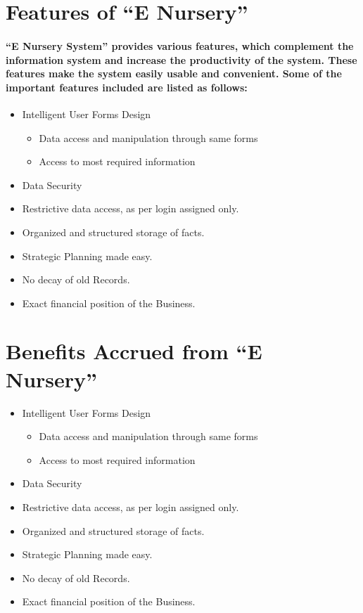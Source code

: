 \documentclass[12pt,a4paper]{report}
\begin{document}
		\section{Features of “E Nursery”}
		\paragraph
		{
			“E Nursery System” provides various features, which complement the information system and increase the productivity of the system. These features make the system easily usable and convenient.  Some of the important features included are listed as follows:
		}
		\begin{itemize}
			\item Intelligent User Forms Design
			      \begin{itemize}
			      	\item Data access and manipulation through same forms
			      	\item Access to most required information
			      \end{itemize}
			                  
			\item Data Security 
			\item Restrictive data access, as per login assigned only.
			\item Organized and structured storage of facts.
			\item Strategic Planning made easy.
			\item No decay of old Records.
			\item Exact financial position of the Business.
		\end{itemize}
		        
		\section{Benefits Accrued from “E Nursery”}
		\begin{itemize}
			\item Intelligent User Forms Design
			      \begin{itemize}
			      	\item Data access and manipulation through same forms
			      	\item Access to most required information
			      \end{itemize}
			                  
			\item Data Security 
			\item Restrictive data access, as per login assigned only.
			\item Organized and structured storage of facts.
			\item Strategic Planning made easy.
			\item No decay of old Records.
			\item Exact financial position of the Business.
		\end{itemize}
\end{document}
